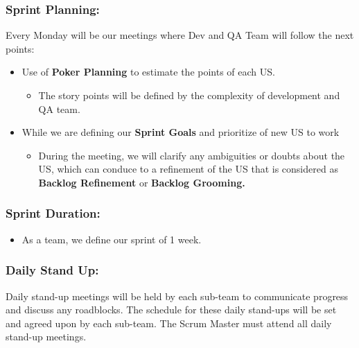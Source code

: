 \hypertarget{sprintplanning}{
\subsubsection{Sprint Planning:}\label{sprintplanning}}

Every Monday will be our meetings where Dev and QA Team will follow the
next points:

\begin{itemize}
\tightlist
\item
  Use of \textbf{Poker Planning} to estimate the points of each US.

  \begin{itemize}
  \tightlist
  \item
    The story points will be defined by the complexity of development
    and QA team.
  \end{itemize}
\item
  While we are defining our \textbf{Sprint Goals} and prioritize of new
  US to work

  \begin{itemize}
  \tightlist
  \item
    During the meeting, we will clarify any ambiguities or doubts about
    the US, which can conduce to a refinement of the US that is
    considered as \textbf{Backlog Refinement} or \textbf{Backlog
    Grooming.}
  \end{itemize}
\end{itemize}

\hypertarget{sprintduration}{
\subsubsection{\texorpdfstring{\textbf{Sprint
Duration:}}{Sprint Duration:}}\label{sprintduration}}

\begin{itemize}
\tightlist
\item
  As a team, we define our sprint of 1 week.
\end{itemize}

\hypertarget{dailystandup}{
\subsubsection{Daily Stand Up:}\label{dailystandup}}

Daily stand-up meetings will be held by each sub-team to communicate
progress and discuss any roadblocks. The schedule for these daily
stand-ups will be set and agreed upon by each sub-team. The Scrum Master
must attend all daily stand-up meetings.

